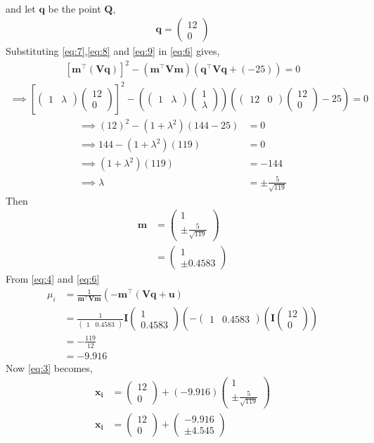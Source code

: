 \documentclass[12pt]{article}
\providecommand{\sbrak}[1]{\ensuremath{{}\left[#1\right]}}
\providecommand{\brak}[1]{\ensuremath{\left(#1\right)}}
\providecommand{\lbrak}[1]{\ensuremath{\left(#1\right.}}
\providecommand{\brak}[1]{\ensuremath{\left(#1\right)}}
\newcommand{\myvec}[1]{\ensuremath{\begin{pmatrix}#1\end{pmatrix}}}
\let\vec\mathbf
\begin{document}
\begin{enumerate}
\begin{align}
\end{align}
and let $\vec{q}$ be the point $\vec{Q}$,
\begin{align}
	\vec{q}=\myvec{12 \\ 0}\label{eq:9}
\end{align}
		Substituting \eqref{eq:7},\eqref{eq:8} and \eqref{eq:9} in \eqref{eq:6} gives,
\begin{align}
	\sbrak{\vec{m}^{\top}\brak{\vec{V}\vec{q}}}^2 - \brak{\vec{m}^{\top}\vec{V}\vec{m}}\brak{\vec{q}^{\top}\vec{V}\vec{q}+(-25)} =0
\end{align}
\begin{align}
\implies\sbrak{\myvec{1 & \lambda}\myvec{12 \\ 0}}^2 - \brak{\myvec{1 & \lambda}\myvec{1 \\ \lambda}}\brak{\myvec{12 & 0}\myvec{12 \\ 0}-25}=0
	\end{align}      
	\begin{align}
		\implies\brak{12}^2-\brak{1+\lambda^2}\brak{144-25} &= 0\\
	\implies144 - \brak{1+\lambda^2}\brak{119} &= 0 \\
	\implies\brak{1+\lambda^2}\brak{119} &= -144 \\
	\implies\lambda &= \pm \frac{5}{\sqrt{119}}
\end{align}
Then
\begin{align}
	\vec{m} &= \myvec{1 \\ \pm \frac{5}{\sqrt{119}}}\\
	&=\myvec{1\\ \pm 0.4583}
\end{align}
From \eqref{eq:4} and \eqref{eq:6}
\begin{align}
	\mu_i &= \frac{1}{\vec{m}^{\top}\vec{V}\vec{m}}\lbrak{-\vec{m}^{\top}\brak{\vec{V}\vec{q}+\vec{u}}}\\
	&= \frac{1}{\myvec{1 & 0.4583}}\vec{I}\myvec{1 \\ 0.4583}\lbrak{-\myvec{1 & 0.4583}\brak{\vec{I}\myvec{12 \\ 0}}} \\
	&= -\frac{119}{12}\\
	&=-9.916
\end{align}
Now \eqref{eq:3} becomes,
\begin{align}
	\vec{x_i} &= \myvec{12 \\ 0}+(-9.916)\myvec{1 \\ \pm \frac{5}{\sqrt{119}}}\\
\vec{x_i} &= \myvec{12 \\ 0}+\myvec{-9.916 \\ \pm 4.545}

\end{align}
\end{enumerate}
\end{document}
